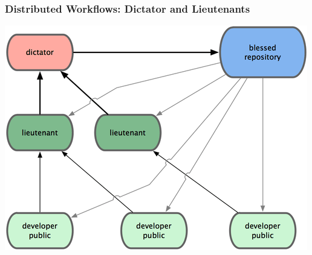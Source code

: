 \documentclass[english,compress]{beamer}
\begin{document}
\frame
{
    \frametitle{Distributed Workflows: Dictator and Lieutenants}

    \begin{center}
        \includegraphics[width=.7\textwidth]{figs/dictator-lieutenant-workflow.png}
    \end{center}

}
\end{document}
